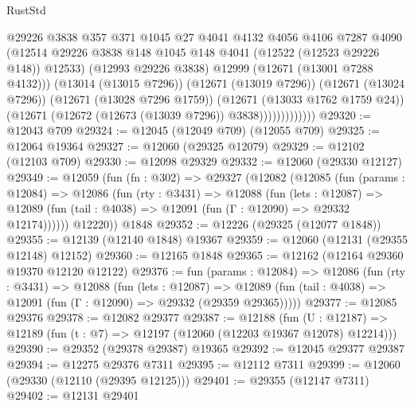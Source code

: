 \begin{lexlean}{RustStd}
\begin{coremodule}
                            @29226
                            @3838
                            @357
                            @371
                            @1045
                            @27
                            @4041
                            @4132
                            @4056
                            @4106
                            @7287
                            @4090
                            (@12514
                              @29226
                              @3838
                              @148
                              @1045
                              @148
                              @4041
                              (@12522 (@12523 @29226 @148))
                              @12533)
                            (@12993 @29226 @3838)
                            @12999
                            (@12671 (@13001 @7288 @4132)))
                          (@13014 (@13015 @7296))
                          (@12671 (@13019 @7296))
                          (@12671 (@13024 @7296))
                          (@12671 (@13028 @7296 @1759))
                          (@12671 (@13033 @1762 @1759 @24))
                          (@12671 (@12672 (@12673 (@13039 @7296)) @3838)))))))))))))
@29320 := @12043 @709
@29324 := @12045 (@12049 @709) (@12055 @709)
@29325 := @12064 @19364
@29327 := @12060 (@29325 @12079)
@29329 := @12102 (@12103 @709)
@29330 := @12098 @29329
@29332 := @12060 (@29330 @12127)
@29349 := @12059
    (fun (fn : @302) =>
    @29327
      (@12082
        (@12085
          (fun (params : @12084) =>
          @12086
            (fun (rty : @3431) =>
            @12088
              (fun (lets : @12087) =>
              @12089 (fun (tail : @4038) => @12091 (fun (Γ : @12090) => @29332 @12174))))))
        @12220))
    @1848
@29352 := @12226 (@29325 (@12077 @1848))
@29355 := @12139 (@12140 @1848) @19367
@29359 := @12060 (@12131 (@29355 @12148) @12152)
@29360 := @12165 @1848
@29365 := @12162 (@12164 @29360 @19370 @12120 @12122)
@29376 := fun (params : @12084) =>
  @12086
    (fun (rty : @3431) =>
    @12088
      (fun (lets : @12087) =>
      @12089 (fun (tail : @4038) => @12091 (fun (Γ : @12090) => @29332 (@29359 @29365)))))
@29377 := @12085 @29376
@29378 := @12082 @29377
@29387 := @12188
    (fun (U : @12187) => @12189 (fun (t : @7) => @12197 (@12060 (@12203 @19367 @12078) @12214)))
@29390 := @29352 (@29378 @29387) @19365
@29392 := @12045 @29377 @29387
@29394 := @12275 @29376 @7311
@29395 := @12112 @7311
@29399 := @12060 (@29330 (@12110 (@29395 @12125)))
@29401 := @29355 (@12147 @7311)
@29402 := @12131 @29401

\end{coremodule}
\end{lexlean}
